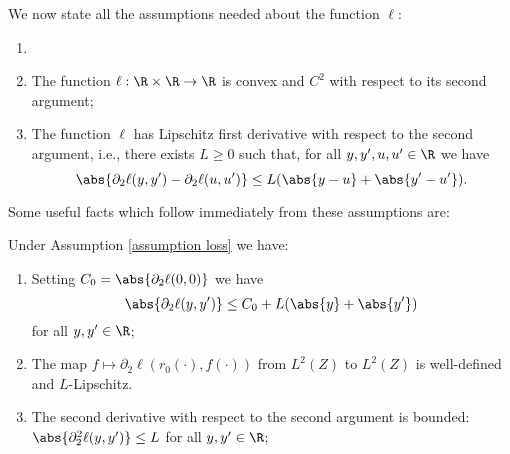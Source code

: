 We now state all the assumptions needed about the function $ \ell $:
\begin{assumption}
    \label{assumption loss}
    \begin{enumerate}
        \item[]
        \item The function $ \ell : \R \times \R \to \R $ is convex and $ C^2 $ with respect to its second argument;
        \item The function $ \ell $ has Lipschitz first derivative with respect to the second argument, i.e., there exists $ L \geq 0 $ such that, for all $ y, y', u, u' \in \R $ we have
            \begin{equation*}
                \abs{ \partial_{ 2 } \ell ( y, y' ) - \partial_{ 2 } \ell ( u, u' ) }
                \leq L ( \abs{ y - u } + \abs{ y' - u' } )
            .\end{equation*}
            \label{en: lipschitz gradients}
    \end{enumerate}
\end{assumption}
Some useful facts which follow immediately from these assumptions are:
\begin{proposition}
    \label{prop: loss properties}
    Under Assumption \ref{assumption loss} we have:
    \begin{enumerate}
        \item \label{bounded growth} Setting $ C_{ 0 } = \abs{ \partial_{ 2 } \ell ( 0, 0 ) } $ we have
            \begin{equation*}
                \abs{ \partial_{ 2 } \ell ( y, y' ) } \leq C_{ 0 } + L ( \abs{ y } + \abs{ y' } )
            \end{equation*}
            for all $ y, y' \in \R $;
        \item \label{continuous composition} The map $ f \mapsto \partial_{ 2 } \ell ( r_{ 0 } ( \cdot ), f ( \cdot ) ) $ from $ L^{ 2 } ( Z ) $ to $ L^{ 2 } ( Z ) $ is well-defined and $ L $-Lipschitz.
        \item \label{bounded second derivative} The second derivative with respect to the second argument is bounded: $ \abs{ \partial_{ 2 }^{ 2 } \ell ( y, y' ) } \leq L $ for all $ y, y' \in \R $;
    \end{enumerate}
\end{proposition}
